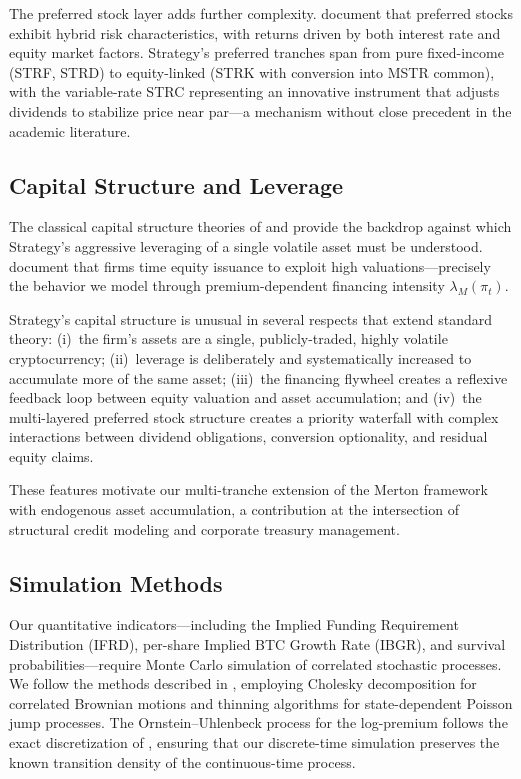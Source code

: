 The preferred stock layer adds further complexity.
\citet{kallberg2013preferred} document that preferred stocks exhibit hybrid risk characteristics, with returns driven by both interest rate and equity market factors.
Strategy's preferred tranches span from pure fixed-income (STRF, STRD) to equity-linked (STRK with conversion into MSTR common), with the variable-rate STRC representing an innovative instrument that adjusts dividends to stabilize price near par---a mechanism without close precedent in the academic literature.

\subsection{Capital Structure and Leverage}

The classical capital structure theories of \citet{modigliani1958cost} and \citet{myers1984capital} provide the backdrop against which Strategy's aggressive leveraging of a single volatile asset must be understood.
\citet{baker2002market} document that firms time equity issuance to exploit high valuations---precisely the behavior we model through premium-dependent financing intensity $\lambda_M(\pi_t)$.

Strategy's capital structure is unusual in several respects that extend standard theory:
(i)~the firm's assets are a single, publicly-traded, highly volatile cryptocurrency;
(ii)~leverage is deliberately and systematically increased to accumulate more of the same asset;
(iii)~the financing flywheel creates a reflexive feedback loop between equity valuation and asset accumulation;
and (iv)~the multi-layered preferred stock structure creates a priority waterfall with complex interactions between dividend obligations, conversion optionality, and residual equity claims.

These features motivate our multi-tranche extension of the Merton framework with endogenous asset accumulation, a contribution at the intersection of structural credit modeling and corporate treasury management.

\subsection{Simulation Methods}

Our quantitative indicators---including the Implied Funding Requirement Distribution (IFRD), per-share Implied BTC Growth Rate (IBGR), and survival probabilities---require Monte Carlo simulation of correlated stochastic processes.
We follow the methods described in \citet{glasserman2004monte}, employing Cholesky decomposition for correlated Brownian motions and thinning algorithms for state-dependent Poisson jump processes.
The Ornstein--Uhlenbeck process for the log-premium follows the exact discretization of \citet{vasicek1977equilibrium}, ensuring that our discrete-time simulation preserves the known transition density of the continuous-time process.
